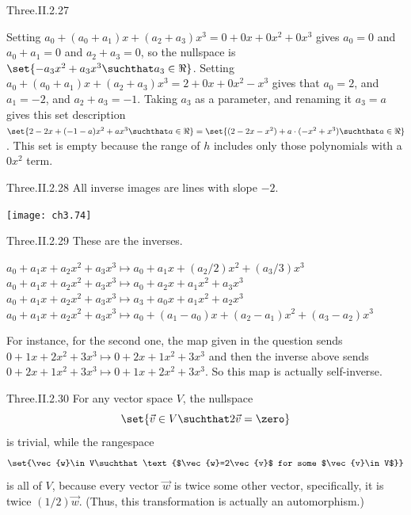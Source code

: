 \begin{ans}{Three.II.2.27}
      \begin{exparts}
        \partsitem Setting $a_0+(a_0+a_1)x+(a_2+a_3)x^3=0+0x+0x^2+0x^3$
           gives $a_0=0$ and $a_0+a_1=0$ and $a_2+a_3=0$, so the nullspace is
           \( \set{-a_3x^2+a_3x^3\suchthat a_3\in\Re} \).
        \partsitem Setting $a_0+(a_0+a_1)x+(a_2+a_3)x^3=2+0x+0x^2-x^3$
           gives that $a_0=2$, and $a_1=-2$, and  $a_2+a_3=-1$.
           Taking $a_3$ as a parameter, and renaming it $a_3=a$ gives
           this set description
           \( \set{2-2x+(-1-a)x^2+ax^3\suchthat a\in\Re}
                =\set{(2-2x-x^2)+a\cdot(-x^2+x^3)\suchthat a\in\Re} \).
        \partsitem This set is empty because the range of $h$ includes only
           those polynomials with a $0x^2$ term.
      \end{exparts}
    
\end{ans}
\begin{ans}{Three.II.2.28}
      All inverse images are lines with slope $-2$.
      \begin{center}
        \texttt{[image: ch3.74]}
     \end{center}
    
\end{ans}
\begin{ans}{Three.II.2.29}
      These are the inverses.
      \begin{exparts}
        \partsitem \( a_0+a_1x+a_2x^2+a_3x^3\mapsto
                        a_0+a_1x+(a_2/2)x^2+(a_3/3)x^3 \)
        \partsitem \( a_0+a_1x+a_2x^2+a_3x^3\mapsto a_0+a_2x+a_1x^2+a_3x^3 \)
        \partsitem \( a_0+a_1x+a_2x^2+a_3x^3\mapsto a_3+a_0x+a_1x^2+a_2x^3 \)
        \partsitem \( a_0+a_1x+a_2x^2+a_3x^3\mapsto
                        a_0+(a_1-a_0)x+(a_2-a_1)x^2+(a_3-a_2)x^3 \)
      \end{exparts}
      For instance, for the second one, the map given in the question sends
      $0+1x+2x^2+3x^3\mapsto 0+2x+1x^2+3x^3$ and then the inverse above
      sends $0+2x+1x^2+3x^3\mapsto 0+1x+2x^2+3x^3$.
      So this map is actually self-inverse.
     
\end{ans}
\begin{ans}{Three.II.2.30}
       For any vector space $V$, the nullspace
       \begin{equation*}
         \set{\vec{v}\in V\suchthat 2\vec{v}=\zero}
       \end{equation*}
       is trivial, while the rangespace
       \begin{equation*}
         \set{\vec{w}\in V\suchthat
                 \text{$\vec{w}=2\vec{v}$ for some $\vec{v}\in V$}}
       \end{equation*}
       is all of \( V \), because every vector $\vec{w}$ is twice some
       other vector, specifically, it is twice $(1/2)\vec{w}$.
       (Thus, this transformation is actually an automorphism.)
    
\end{ans}
